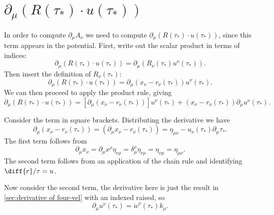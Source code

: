 \documentclass[fleqn]{NotesClass}
\begin{document}
    \section{\texorpdfstring{\(\partial_\mu(R(\tau_*) \cdot u(\tau_*))\)}{Derivative of R dot u}}
    In order to compute \(\partial_\mu A_\nu\) we need to compute \(\partial_\mu (R(\tau_*) \cdot u(\tau_*))\), since this term appears in the potential.
    First, write out the scalar product in terms of indices:
    \begin{equation}
        \partial_\mu(R(\tau_*) \cdot u(\tau_*)) = \partial_\mu(R_\nu(\tau_*) u^\nu(\tau_*)).
    \end{equation}
    Then insert the definition of \(R_\nu(\tau_*)\):
    \begin{equation}
        \partial_\mu(R(\tau_*) \cdot u(\tau_*)) = \partial_\mu(x_\nu - r_\nu(\tau_*)) u^\nu(\tau_*).
    \end{equation}
    We can then proceed to apply the product rule, giving
    \begin{equation}
        \partial_\mu(R(\tau_*) \cdot u(\tau_*)) = [\partial_\mu(x_\nu - r_\nu(\tau_*))]u^\nu(\tau_*) + (x_\nu - r_\nu(\tau_*))\partial_\mu u^\nu(\tau_*).
    \end{equation}
    
    Consider the term in square brackets.
    Distributing the derivative we have
    \begin{equation}
        \partial_\mu(x_\nu - r_\nu(\tau_*)) = (\partial_\mu x_\nu - r_\nu(\tau_*)) = \eta_{\mu\nu} - u_\nu(\tau_*)\partial_\mu \tau_*.
    \end{equation}
    The first term follows from
    \begin{equation}
        \partial_\mu x_\nu = \partial_\mu x^\rho \eta_{\nu\rho} = \delta_\mu^\rho \eta_{\nu\rho} = \eta_{\nu\mu} = \eta_{\mu\nu}.
    \end{equation}
    The second term follows from an application of the chain rule and identifying \(\diff{r}/{\tau} = u\).
    
    Now consider the second term, the derivative here is just the result in \cref{sec:derivative of four-vel} with an indexed raised, so
    \begin{equation}
        \partial_\mu u^\nu(\tau_*) = \dot{w}^\nu(\tau_*) k_\mu.
    \end{equation}
    
\end{document}
